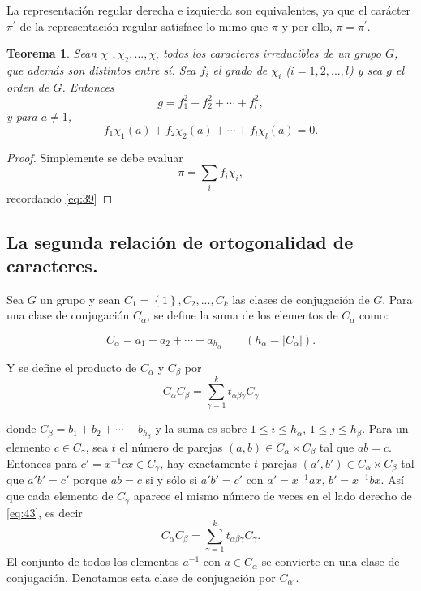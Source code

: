 \documentclass[12pt]{book}
\newtheorem{theorem}{Teorema}[section]
\theoremstyle{definition}
\newcounter{in}
\begin{document}
La representación regular derecha e izquierda son equivalentes, ya que
el carácter $\pi^{'}$ de la representación regular satisface lo mimo
que $\pi$ y por ello, $\pi = \pi^{'}$.

\begin{theorem}
  \label{t4_8}
  Sean $\chi_{1}, \chi_{2},...,\chi_{l} $ todos
  los caracteres irreducibles de un grupo $G$, que además son distintos
  entre sí. Sea $f_{i}$ el grado de $\chi_{i}$ ($i=1, 2,..., l$) y sea
  $g$ el orden de $G$. Entonces
  \begin{equation*}
    g=f_{1}^{2}+f_{2}^{2}+ \cdots + f_{l}^{2},
  \end{equation*}
  y para $a \neq 1$,
  \begin{equation*}
    f_{1} \chi_{1}(a)+f_{2} \chi_{2}(a)+ \cdots + f_{l} \chi_{l}(a) = 0.
  \end{equation*}
\end{theorem}
\begin{proof}
  Simplemente se debe evaluar
  \begin{equation}
    \label{eq:41}
    \pi=\sum_{i} f_{i} \chi_{i},
  \end{equation}
 recordando \ref{eq:39}
\end{proof}
\subsection{La segunda relación de ortogonalidad de caracteres.}
\label{subsec:sroc}
Sea $G$ un grupo y sean $C_{1}=\left\{1 \right\},C_{2},...,C_{k}$ las
clases de conjugación de $G$. Para una clase de conjugación
$C_{\alpha}$, se define la suma de los elementos de $C_{\alpha}$ como:

\begin{equation}
  \label{eq:42}
  C_{\alpha}=a_{1}+a_{2}+ \cdots + a_{h_{\alpha}} \qquad (h_{\alpha}=|C_{\alpha}|).
\end{equation}

Y se define el producto de $C_{\alpha}$ y $C_{\beta}$ por
\begin{equation}
  \label{eq:43}
  C_{\alpha} C_{\beta} = \sum_{\gamma=1}^{k} t_{\alpha \beta \gamma} C_{\gamma}
\end{equation}

donde $C_{\beta}=b_1+b_{2}+ \cdots + b_{h_{\beta}}$ y la suma es sobre
$1 \leq i \leq h_{\alpha}$, $1 \leq j \leq h_{\beta}$. Para un
elemento $c \in C_{\gamma}$, sea $t$ el número de parejas
$(a,b) \in C_{\alpha} \times C_{\beta}$ tal que $ab=c$. Entonces para
$c'=x^{-1}cx \in C_{\gamma}$, hay exactamente $t$ parejas
$(a',b') \in C_{\alpha} \times C_{\beta}$ tal que $a'b'=c'$ porque
$ab=c$ si y sólo si $a'b'=c'$ con $a'=x^{-1}ax$, $b'=x^{-1}bx$. Así
que cada elemento de $C_{\gamma}$ aparece el mismo número de veces en
el lado derecho de \ref{eq:43}, es decir
\begin{equation}
  \label{eq:44}
  C_{\alpha} C_{\beta} = \sum_{\gamma=1}^{k} t_{\alpha \beta \gamma} C_{\gamma}.
\end{equation}
El conjunto de todos los elementos $a^{-1}$ con $a \in C_{\alpha}$ se
convierte en una clase de conjugación. Denotamos esta clase de
conjugación por $C_{\alpha '}$.
\end{document}
